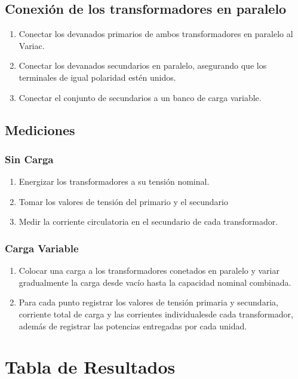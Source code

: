 \documentclass[12pt]{article}
\begin{document}
\subsection{Conexi\'on de los transformadores en paralelo}
\begin{enumerate}
    \item Conectar los devanados primarios de ambos transformadores en paralelo al Variac.
    \item Conectar los devanados secundarios en paralelo, asegurando que los terminales de igual polaridad est\'en unidos. 
    \item Conectar el conjunto de secundarios a un banco de carga variable.
\end{enumerate}

\subsection{Mediciones}

\subsubsection{Sin Carga}

\begin{enumerate}
    \item Energizar los transformadores a su tensi\'on nominal.
    \item Tomar los valores de tensi\'on del primario y el secundario
    \item Medir la corriente circulatoria en el secundario de cada transformador.
\end{enumerate}

\subsubsection{Carga Variable}

\begin{enumerate}
    \item Colocar una carga a los transformadores conetados en paralelo y variar gradualmente la carga desde vac\'io hasta la capacidad nominal combinada.
    \item Para cada punto registrar los valores de tensi\'on primaria y secundaria, corriente total de carga y las corrientes individualesde cada transformador, adem\'as de registrar las potencias entregadas por cada unidad.
\end{enumerate}

\section{Tabla de Resultados}
\end{document}
